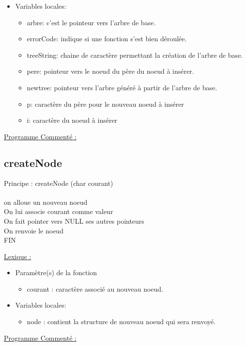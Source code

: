 \documentclass[a4paper]{article}
\newcommand\tab[1][1cm]{\hspace*{#1}}
\begin{document}
\begin{itemize}
\item Variables locales:
\begin{itemize}
\item arbre: c'est le pointeur vers l'arbre de base.
\item errorCode: indique si une fonction s'est bien déroulée.
\item treeString: chaine de caractère permettant la création de l'arbre de base.
\item pere: pointeur vers le noeud du père du noeud à insérer.
\item newtree: pointeur vers l'arbre généré à partir de l'arbre de base.
\item p: caractère du père pour le nouveau noeud à insérer
\item i: caractère du noeud à insérer
\end{itemize}
\end{itemize}
\underline{Programme Commenté :}



\subsection{createNode}

\begin{algorithm}
Principe :  createNode (char courant)
\\
\\
\tab on alloue un nouveau noeud
\\
\tab On lui associe courant comme valeur
\\
\tab On fait pointer vers NULL ses autres pointeurs
\\
\tab On renvoie le noeud
\\
FIN
\end{algorithm}
\underline{Lexique :}
\begin{itemize}
\item Paramètre(s) de la fonction  
\begin{itemize}
\item courant : caractère associé au nouveau noeud.
\end{itemize}
\item Variables locales:
\begin{itemize}
\item node : contient la structure de nouveau noeud qui sera renvoyé.
\end{itemize}
\end{itemize}
\underline{Programme Commenté :}
\end{document}
